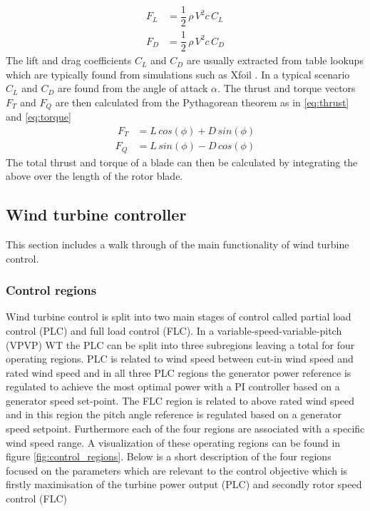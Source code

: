 \begin{align}
	F_L &= \dfrac{1}{2}\,  \rho \, V^2 c \, C_L \label{eq:lift}\\
	F_D &= \dfrac{1}{2} \, \rho \, V^2 c \, C_D \label{eq:drag}
\end{align}
The lift and drag coefficients $ C_L $ and $ C_D $ are usually extracted from table lookups which are typically found from simulations such as Xfoil
. 
In a typical scenario $ C_L $ and $ C_D $ are found from the angle of attack $ \alpha $. The thrust and torque vectors $ F_T $ and $ F_Q $ are then calculated from the Pythagorean theorem as in \cref{eq:thrust} and \cref{eq:torque}
\begin{align}\
	F_T &= L \, cos(\phi) + D \, sin(\phi) \label{eq:thrust} \\
	F_Q &= L \, sin(\phi) - D \, cos(\phi) \label{eq:torque}
\end{align}
The total thrust and torque of a blade can then be calculated by integrating the above over the length of the rotor blade.


\subsection{Wind turbine controller} \label{sec:theory_ctrl}
This section includes a walk through of the main functionality of wind turbine control. 

\subsubsection{Control regions} 
Wind turbine control is split into two main stages of control called partial load control (PLC) and full load control (FLC). In a variable-speed-variable-pitch (VPVP) WT the PLC can be split into three subregions leaving a total for four operating regions. PLC is related to wind speed between cut-in wind speed and rated wind speed and in all three PLC regions the generator power reference is regulated to achieve the most optimal power with a PI controller based on a generator speed set-point. The FLC region is related to above rated wind speed and in this region the pitch angle reference is regulated based on a generator speed setpoint. Furthermore each of the four regions are associated with a specific wind speed range. A visualization of these operating regions can be found in figure \cref{fig:control_regions}. Below is a short description of the four regions focused on the parameters which are relevant to the control objective which is firstly maximisation of the turbine power output (PLC) and secondly rotor speed control (FLC)

